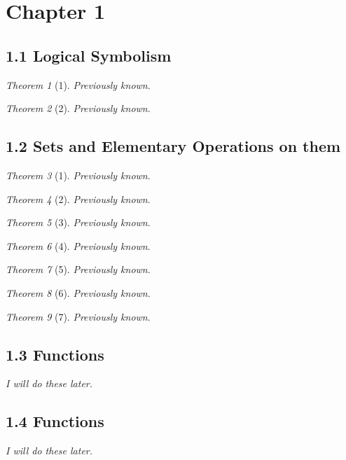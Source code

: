 \documentclass[12pt]{article}
\theoremstyle{remark}
\theoremstyle{named}
\newtheorem*{problem}{Theorem}
\newcommand{\pk}{\textit{Previously known}}
\begin{document}
\section*{Chapter 1}
\subsection*{1.1 Logical Symbolism}
\begin{problem}[1]
    \pk.
\end{problem}

\begin{problem}[2]
    \pk.
\end{problem}

\newpage
\subsection*{1.2 Sets and Elementary Operations on them}

\begin{problem}[1]
    \pk.
\end{problem}

\begin{problem}[2]
    \pk.
\end{problem}

\begin{problem}[3]
    \pk.
\end{problem}

\begin{problem}[4]
    \pk.
\end{problem}

\begin{problem}[5]
    \pk.
\end{problem}

\begin{problem}[6]
    \pk.
\end{problem}

\begin{problem}[7]
    \pk.
\end{problem}

\newpage
\subsection*{1.3 Functions}
\textit{I will do these later.}

\newpage
\subsection*{1.4 Functions}
\textit{I will do these later.}
\end{document}
